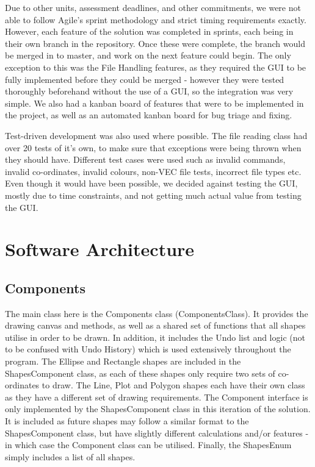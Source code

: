 \documentclass[12pt]{article} %
\begin{document}
Due to other units, assessment deadlines, and other commitments, we were not able to follow Agile's sprint methodology and strict timing requirements exactly. However, each feature  of the solution was completed in sprints, each being in their own branch in the repository. Once these were complete, the branch would be merged in to master, and work on the next feature could begin. The only exception to this was the File Handling features, as they required the GUI to be fully implemented before they could be merged - however they were tested thoroughly beforehand without the use of a GUI, so the integration was very simple. We also had a kanban board of features that were to be implemented in the project, as well as an automated kanban board for bug triage and fixing.

Test-driven development was also used where possible. The file reading class had over 20 tests of it's own, to make sure that exceptions were being thrown when they should have. Different test cases were used such as invalid commands, invalid co-ordinates, invalid colours, non-VEC file tests, incorrect file types etc. Even though it would have been possible, we decided against testing the GUI, mostly due to time constraints, and not getting much actual value from testing the GUI.


\newpage

\section{Software Architecture}

\subsection{Components}
The main class here is the Components class (ComponentsClass). It provides the drawing canvas and methods, as well as a shared set of functions that all shapes utilise in order to be drawn. In addition, it includes the Undo list and logic (not to be confused with Undo History) which is used extensively throughout the program. The Ellipse and Rectangle shapes are included in the ShapesComponent class, as each of these shapes only require two sets of co-ordinates to draw. The Line, Plot and Polygon shapes each have their own class as they have a different set of drawing requirements. The Component interface is only implemented by the ShapesComponent class in this iteration of the solution. It is included as future shapes may follow a similar format to the ShapesComponent class, but have slightly different calculations and/or features - in which case the Component class can be utilised. Finally, the ShapesEnum simply includes a list of all shapes.
\end{document}
